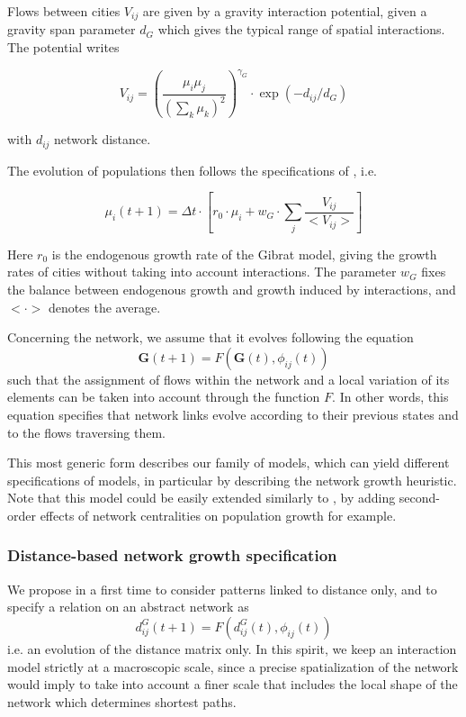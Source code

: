 \documentclass[11pt]{article}
\begin{document}
Flows between cities $V_{ij}$ are given by a gravity interaction potential, given a gravity span parameter $d_G$ which gives the typical range of spatial interactions. The potential writes

\begin{equation}
\label{eq:gravity}
V_{ij} = \left(\frac{\mu_i\mu_j}{\left(\sum_k{\mu_k}\right)^2}\right)^{\gamma_G}\cdot \exp{\left(-d_{ij}/d_G\right)}
\end{equation}

with $d_{ij}$ network distance.


The evolution of populations then follows the specifications of \cite{raimbault2018indirect}, i.e.

\begin{equation}
\label{eq:genspec}
\mu_i(t+1)=\Delta t\cdot \left[ r_0\cdot \mu_i + w_G\cdot \sum_j \frac{V_{ij}}{<V_{ij}>}\right]
\end{equation}

Here $r_0$ is the endogenous growth rate of the Gibrat model, giving the growth rates of cities without taking into account interactions. The parameter $w_G$ fixes the balance between endogenous growth and growth induced by interactions, and $< \cdot >$ denotes the average.

Concerning the network, we assume that it evolves following the equation
\begin{equation}
\label{eq:nwgengrowth}
\mathbf{G}(t + 1) = F(\mathbf{G}(t),\phi_{ij}(t))
\end{equation}
such that the assignment of flows within the network and a local variation of its elements can be taken into account through the function $F$. In other words, this equation specifies that network links evolve according to their previous states and to the flows traversing them.

This most generic form describes our family of models, which can yield different specifications of models, in particular by describing the network growth heuristic. Note that this model could be easily extended similarly to \cite{raimbault2018indirect}, by adding second-order effects of network centralities on population growth for example.

\subsubsection{Distance-based network growth specification}

We propose in a first time to consider patterns linked to distance only, and to specify a relation on an abstract network as
\begin{equation}
d^G_{ij}(t+1) = F(d^G_{ij}(t),\phi_{ij}(t))
\end{equation}
i.e. an evolution of the distance matrix only. In this spirit, we keep an interaction model strictly at a macroscopic scale, since a precise spatialization of the network would imply to take into account a finer scale that includes the local shape of the network which determines shortest paths.
\end{document}
